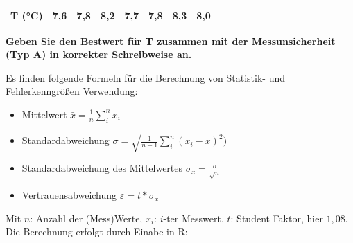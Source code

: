 \documentclass[
]{article}
\providecommand{\tightlist}{%
  \setlength{\itemsep}{0pt}\setlength{\parskip}{0pt}}
\begin{document}
\begin{longtable}[]{@{}llllllll@{}}
	\toprule()
	\endhead
	T (°C) & 7,6 & 7,8 & 8,2 & 7,7 & 7,8 & 8,3 & 8,0 \\
	\bottomrule()
\end{longtable}

\newpage

\textbf{Geben Sie den Bestwert für T zusammen mit der Messunsicherheit (Typ A) in korrekter Schreibweise an.}

Es finden folgende Formeln für die Berechnung von Statistik- und
Fehlerkenngrößen Verwendung:

\begin{itemize}
	\tightlist
	\item  Mittelwert \(\bar{x} = \frac{1}{n}\sum\limits_{i}^{n}x_i\)
	\item  Standardabweichung  \(\sigma = \sqrt{\frac{1}{n-1}\sum\limits_{i}^{n}(x_i-\bar{x})^2)}\)
	\item  Standardabweichung des Mittelwertes \(\sigma_{\bar{x}} = \frac{\sigma}{\sqrt{n}}\)
	\item  Vertrauensabweichung \(\varepsilon = t*\sigma_{\bar{x}}\)
\end{itemize}

Mit \(n\): Anzahl der (Mess)Werte, \(x_i\): \(i\)-ter Messwert, \(t\): Student Faktor, hier \(1,08\).
Die Berechnung erfolgt durch Einabe in R:
\end{document}
